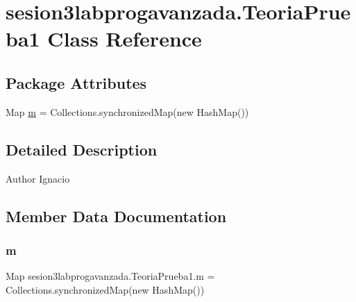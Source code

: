\hypertarget{classsesion3labprogavanzada_1_1_teoria_prueba1}{}\section{sesion3labprogavanzada.\+Teoria\+Prueba1 Class Reference}
\label{classsesion3labprogavanzada_1_1_teoria_prueba1}
\subsection*{Package Attributes}
\begin{DoxyCompactItemize}
\item 
Map \mbox{\hyperlink{classsesion3labprogavanzada_1_1_teoria_prueba1_a60d3a73ecb7327ef995f47ad3ab172cb}{m}} = Collections.\+synchronized\+Map(new Hash\+Map())
\end{DoxyCompactItemize}


\subsection{Detailed Description}
\begin{DoxyAuthor}{Author}
Ignacio 
\end{DoxyAuthor}


\subsection{Member Data Documentation}
\mbox{\label{classsesion3labprogavanzada_1_1_teoria_prueba1_a60d3a73ecb7327ef995f47ad3ab172cb}} 
\subsubsection{\texorpdfstring{m}{m}}
{\footnotesize\ttfamily Map sesion3labprogavanzada.\+Teoria\+Prueba1.\+m = Collections.\+synchronized\+Map(new Hash\+Map())\hspace{0.3cm}{\ttfamily [package]}}

